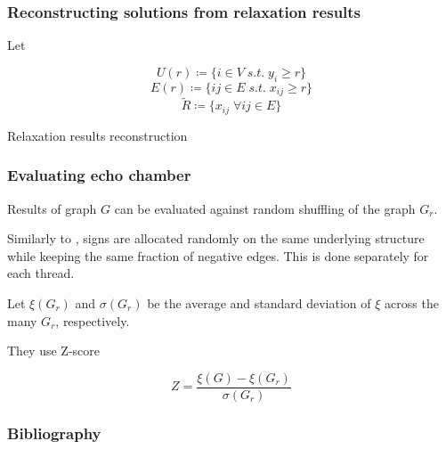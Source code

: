 \documentclass{beamer}
\begin{document}
\begin{frame}[c]
	\frametitle{Reconstructing solutions from relaxation results}
	Let

	\begin{equation*}
		U(r) \coloneqq \{ i \in V \; s.t. \; y_i \geq r\}
	\end{equation*}
	\begin{equation*}
		E(r) \coloneqq \{ ij \in E \; s.t. \; x_{ij} \geq r\}
	\end{equation*}
	\begin{equation*}
		\tilde{R} \coloneqq \{ x_{ij} \; \forall ij \in E \}
	\end{equation*}
	\begin{algorithm}[H]
		\SetAlgoLined
		\caption{Relaxation results reconstruction}
	\end{algorithm}

\end{frame}

\begin{frame}[c]
	\frametitle{Evaluating echo chamber}
	Results of graph $G$ can be evaluated against random shuffling of the graph
	$G_{r} $.

	\bigskip
	Similarly to \cite{Aref_2018}, signs are allocated randomly on the same
	underlying structure while keeping the same fraction of negative edges.
	This is done separately for each thread.

	\bigskip
	Let $\xi(G_{r} )$ and $\sigma(G_{r} ) $ be the average and standard deviation of
	$\xi$ across the many $G_{r} $, respectively.

	They use Z-score

	\begin{equation}
		Z = \frac{\xi(G) - \xi(G_{r} )}{\sigma(G_{r} ) }
	\end{equation}


\end{frame}


\begin{frame}[c]
	\frametitle{Bibliography}
	\printbibliography
\end{frame}
\end{document}
